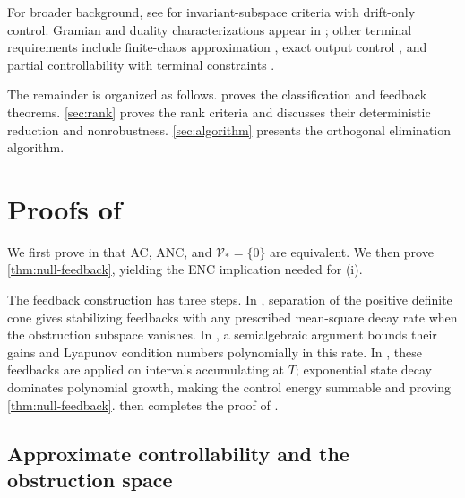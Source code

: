 \documentclass[twocolumn]{autart}
\newcounter{part}
\begin{document}
 
%

For broader background, see  \cite{BuckdahnQuincampoixTessitore2006} for invariant-subspace criteria with drift-only control. Gramian and duality characterizations appear in \cite{Liu2010,WYYY}; other terminal requirements include finite-chaos approximation \cite{Dou2019}, exact output control \cite{WangYu2020}, and partial controllability with terminal constraints \cite{Song2023}.

The remainder is organized as follows.  proves the classification and feedback theorems. \cref{sec:rank} proves the rank criteria and discusses their deterministic reduction and nonrobustness. \cref{sec:algorithm} presents the orthogonal elimination algorithm.


\section{Proofs of \texorpdfstring{}{the classification and feedback theorems}}\label{sec:proof}

We first prove in  that AC, ANC, and \(\mathcal V_*=\{0\}\) are equivalent. We then prove \cref{thm:null-feedback}, yielding the ENC implication needed for (i).

The feedback construction has three steps. In , separation of the positive definite cone gives stabilizing feedbacks with any prescribed mean-square decay rate when the obstruction subspace vanishes. In , a semialgebraic argument bounds their gains and Lyapunov condition numbers polynomially in this rate. In , these feedbacks are applied on intervals accumulating at \(T\); exponential state decay dominates polynomial growth, making the control energy summable and proving \cref{thm:null-feedback}.  then completes the proof of .

\subsection{Approximate controllability and the obstruction space}
\label{sec:approximate}
\end{document}
